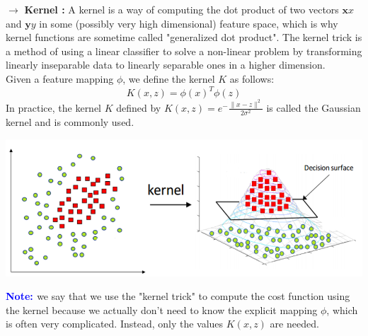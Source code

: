 \documentclass[letterpaper, 10.5pt,landscape]{article}
\begin{document}
\begin{multicols*}{3}
\vspace{3pt}
$\rightarrow$ \textbf{Kernel : } A kernel is a way of computing the dot product of two vectors $\textbf{x}x$ and $\textbf{y}y$ in some (possibly very high dimensional) feature space, which is why kernel functions are sometime called "generalized dot product". The kernel trick is a method of using a linear classifier to solve a non-linear problem by transforming linearly inseparable data to linearly separable ones in a higher dimension.\\

\vspace{3pt}
Given a feature mapping $\phi$, we define the kernel $K$ as follows:
\vspace{-4pt}
\[\boxed{K(x, z) = \phi(x)^{T} \phi(z)} \] 
In practice, the kernel $K$ defined by $\boxed{K(x, z) =  e^-{\frac{\lVert x - z \rVert^{2}}{2\sigma^{2}}}}$ is called the Gaussian kernel and is commonly used.

\vspace{-5pt}
\begin{center}
    \begin{minipage}{0.9\linewidth}
    \includegraphics[width=\textwidth]{figures/kernel_SVM.PNG}
    \end{minipage}
\end{center}

\vspace{-5pt}

\textbf{\textcolor{blue}{Note: }} we say that we use the "kernel trick" to compute the cost function using the kernel because we actually don't need to know the explicit mapping $\phi$, which is often very complicated. Instead, only the values $K(x,z)$ are needed.




\end{multicols*}
\end{document}
